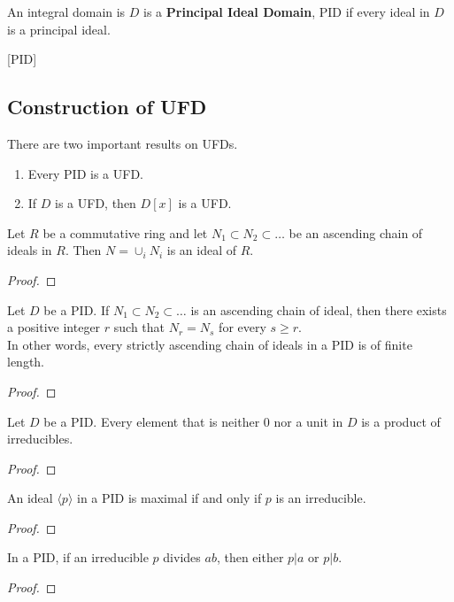 \begin{definition}
	An integral domain is $D$ is a \textbf{Principal Ideal Domain}, PID if every ideal in $D$ is a principal ideal.
\end{definition}[PID]

\subsection{Construction of UFD}
There are two important results on UFDs.
\begin{enumerate}
	\item Every PID is a UFD.
	\item If $D$ is a UFD, then $D[x]$ is a UFD.
\end{enumerate}

\begin{lemma}
	Let $R$ be a commutative ring and let $N_1 \subset N_2 \subset \dots $ be an ascending chain of ideals in $R$.
	Then $N = \cup_i N_i$ is an ideal of $R$.
\end{lemma}
\begin{proof}
\end{proof}

\begin{lemma}
	Let $D$ be a PID.
	If $N_1 \subset N_2 \subset \dots$ is an ascending chain of ideal, then there exists a positive integer $r$ such that $N_r = N_s$ for every $s \ge r$.\\

	In other words, every strictly ascending chain of ideals in a PID is of finite length.
\end{lemma}
\begin{proof}
\end{proof}

\begin{theorem}
	Let $D$ be a PID.
	Every element that is neither $0$ nor a unit in $D$ is a product of irreducibles.
\end{theorem}
\begin{proof}
\end{proof}

\begin{lemma}
	An ideal $\langle p \rangle$ in a PID is maximal if and only if $p$ is an irreducible.
\end{lemma}
\begin{proof}
\end{proof}

\begin{lemma}
	In a PID, if an irreducible $p$ divides $ab$, then either $p|a$ or $p|b$.
\end{lemma}
\begin{proof}
\end{proof}


